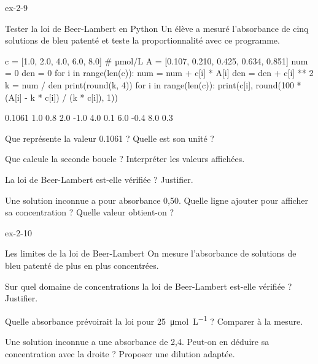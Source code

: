 \begin{blocLivre}{ex-2-9}
\begin{exercice}[2]{Tester la loi de Beer-Lambert en Python}
Un élève a mesuré l'absorbance de cinq solutions de bleu patenté et teste la proportionnalité avec ce programme.
\begin{python}
c = [1.0, 2.0, 4.0, 6.0, 8.0]           # µmol/L
A = [0.107, 0.210, 0.425, 0.634, 0.851]
num = 0
den = 0
for i in range(len(c)):
    num = num + c[i] * A[i]
    den = den + c[i] ** 2
k = num / den
print(round(k, 4))
for i in range(len(c)):
    print(c[i], round(100 * (A[i] - k * c[i]) / (k * c[i]), 1))
\end{python}
\begin{console}
0.1061
1.0 0.8
2.0 -1.0
4.0 0.1
6.0 -0.4
8.0 0.3
\end{console}
\begin{questions}
\item {}Que représente la valeur 0.1061 ? Quelle est son unité ?
\item Que calcule la seconde boucle ? Interpréter les valeurs affichées.
\item La loi de Beer-Lambert est-elle vérifiée ? Justifier.
\item Une solution inconnue a pour absorbance 0,50. Quelle ligne ajouter pour afficher sa concentration ? Quelle valeur
obtient-on ?
\end{questions}
\end{exercice}
\end{blocLivre}
\begin{blocLivre}{ex-2-10}
\begin{exercice}[2]{Les limites de la loi de Beer-Lambert}
On mesure l'absorbance de solutions de bleu patenté de plus en plus concentrées.
\begin{questions}
\item Sur quel domaine de concentrations la loi de Beer-Lambert est-elle vérifiée ? Justifier.
\item Quelle absorbance prévoirait la loi pour \qty{25}{\micro mol.L^{-1}} ? Comparer à la mesure.
\item Une solution inconnue a une absorbance de 2,4. Peut-on en déduire sa concentration avec la droite ? Proposer une
dilution adaptée.
\end{questions}
\end{exercice}
\end{blocLivre}
